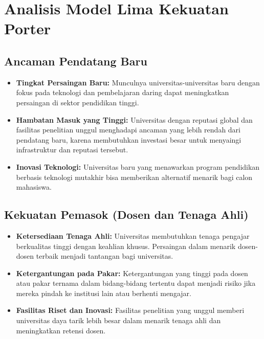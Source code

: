 \section{Analisis Model Lima Kekuatan Porter}

\subsection{Ancaman Pendatang Baru}
\begin{itemize}
	\item \textbf{Tingkat Persaingan Baru:} Munculnya universitas-universitas baru dengan fokus pada teknologi dan pembelajaran daring dapat meningkatkan persaingan di sektor pendidikan tinggi.
	\item \textbf{Hambatan Masuk yang Tinggi:} Universitas dengan reputasi global dan fasilitas penelitian unggul menghadapi ancaman yang lebih rendah dari pendatang baru, karena membutuhkan investasi besar untuk menyaingi infrastruktur dan reputasi tersebut.
	\item \textbf{Inovasi Teknologi:} Universitas baru yang menawarkan program pendidikan berbasis teknologi mutakhir bisa memberikan alternatif menarik bagi calon mahasiswa.
\end{itemize}

\subsection{Kekuatan Pemasok (Dosen dan Tenaga Ahli)}
\begin{itemize}
	\item \textbf{Ketersediaan Tenaga Ahli:} Universitas membutuhkan tenaga pengajar berkualitas tinggi dengan keahlian khusus. Persaingan dalam menarik dosen-dosen terbaik menjadi tantangan bagi universitas.
	\item \textbf{Ketergantungan pada Pakar:} Ketergantungan yang tinggi pada dosen atau pakar ternama dalam bidang-bidang tertentu dapat menjadi risiko jika mereka pindah ke institusi lain atau berhenti mengajar.
	\item \textbf{Fasilitas Riset dan Inovasi:} Fasilitas penelitian yang unggul memberi universitas daya tarik lebih besar dalam menarik tenaga ahli dan meningkatkan retensi dosen.
\end{itemize}

